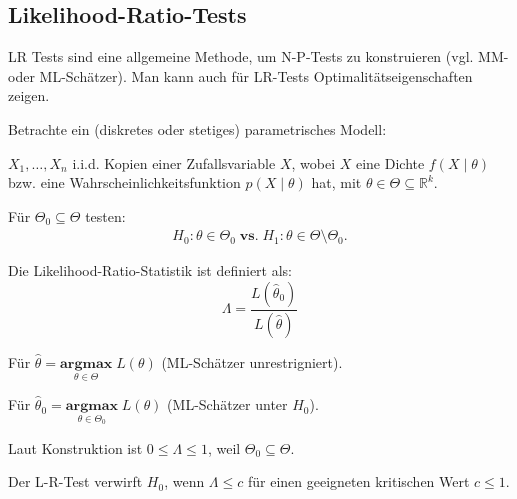 \documentclass[10pt]{article}
\newcommand{\FZV}{X_1, \ldots, X_n} %
\newcommand{\IR}{\mathbb{R}} %
\begin{document}
	\subsection{Likelihood-Ratio-Tests}
	LR Tests sind eine allgemeine Methode, um N-P-Tests zu konstruieren (vgl. MM- oder ML-Schätzer). Man kann auch für LR-Tests Optimalitätseigenschaften zeigen.
	
	Betrachte ein (diskretes oder stetiges) parametrisches Modell:
	
	$\FZV$ i.i.d. Kopien einer Zufallsvariable $X$, wobei $X$ eine Dichte $f(X \mid \theta)$ bzw. eine Wahrscheinlichkeitsfunktion $p(X\mid \theta)$ hat, mit $\theta \in \Theta \subseteq \IR^k$.
	
	Für $\Theta_0 \subseteq \Theta$ testen:
	\begin{equation*}
		\begin{split}
			H_0: \theta \in \Theta_0 \; \textbf{vs.} \; H_1: \theta \in \Theta \setminus \Theta_0.
		\end{split}
	\end{equation*}
	
	\begin{Definition} 
		Die Likelihood-Ratio-Statistik ist definiert als:
		\begin{equation*}
			\Lambda = \frac{L(\hat{\theta}_0)}{L(\hat{\theta})}
		\end{equation*}
		
		Für $\hat{\theta} = \underset{\theta \in \Theta}{\textbf{argmax}} \; L(\theta)$ (ML-Schätzer unrestrigniert).
		
		Für $\hat{\theta}_0 = \underset{\theta \in \Theta_0}{\textbf{argmax}} \; L(\theta)$ (ML-Schätzer unter $H_0$).
		
		Laut Konstruktion ist $0 \leq \Lambda \leq 1$, weil $\Theta_0 \subseteq \Theta$.
		
		Der L-R-Test verwirft $H_0$, wenn $\Lambda \leq c$ für einen geeigneten kritischen Wert $c \leq 1$. 
	\end{Definition}
	
\end{document}
